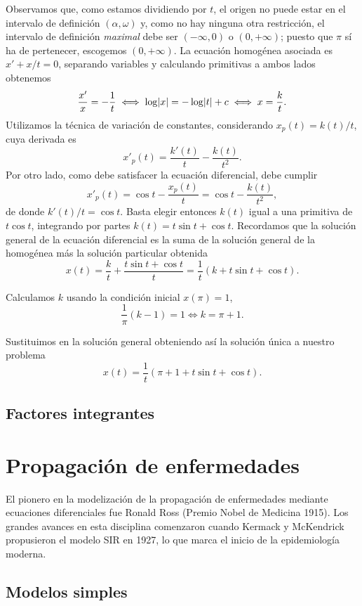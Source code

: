 \documentclass[../ecuaciones_diferenciales.tex]{subfiles}
\begin{document}
\begin{solution}
	Observamos que, como estamos dividiendo por \(t\), el origen no puede estar
	en el intervalo de definición \((\alpha, \omega)\) y, como no hay ninguna
	otra restricción, el intervalo de definición \emph{maximal} debe ser
	\((-\infty, 0)\) o \((0,+\infty)\); puesto que \(\pi\) sí ha de pertenecer,
	escogemos \((0, +\infty)\). La ecuación homogénea asociada es
	\(x' + x/t = 0\), separando variables y calculando primitivas a ambos lados
	obtenemos
	\[\frac{x'}{x} = -\frac{1}{t} \iff \log\abs{x}
		= -\log\abs{t} + c \iff x = \frac{k}{t}.\]
	Utilizamos la técnica de variación de constantes, considerando
	\(x_p(t) = k(t)/t\), cuya derivada es
	\[x'_p(t) = \frac{k'(t)}{t} - \frac{k(t)}{t^2}.\]
	Por otro lado, como debe satisfacer la ecuación diferencial, debe cumplir
	\[x'_p(t) = \cos t - \frac{x_p(t)}{t} = \cos t - \frac{k(t)}{t^2},\]
	de donde \(k'(t)/t = \cos t\). Basta elegir entonces \(k(t)\) igual a una
	primitiva de \(t \cos t\), integrando por partes
	\(k(t) = t \sin t + \cos t\). Recordamos que la solución general de la
	ecuación diferencial es la suma de la solución general de la homogénea más
	la solución particular obtenida
	\[x(t) = \frac{k}{t} + \frac{t \sin t + \cos t}{t}
		= \frac{1}{t}(k + t \sin t + \cos t).\]

	Calculamos \(k\) usando la condición inicial \(x(\pi) = 1\),
	\[\frac{1}{\pi}(k - 1) = 1 \iff k = \pi + 1.\]

	Sustituimos en la solución general obteniendo así la solución única a
	nuestro problema
	\[x(t) = \frac{1}{t}(\pi + 1 + t \sin t + \cos t).\]
\end{solution}

\subsection{Factores integrantes}

\section{Propagación de enfermedades}

El pionero en la modelización de la propagación de enfermedades mediante
ecuaciones diferenciales fue Ronald Ross (Premio Nobel de Medicina 1915). Los
grandes avances en esta disciplina comenzaron cuando Kermack y McKendrick
propusieron el modelo SIR en 1927, lo que marca el inicio de la
epidemiología moderna.

\subsection{Modelos simples}
\end{document}
